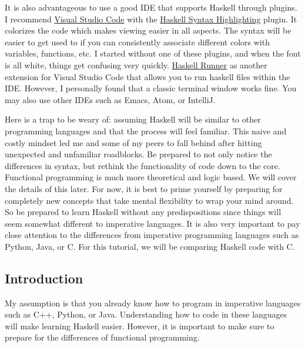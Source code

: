 \documentclass{article}
\begin{document}
\medskip\noindent
It is also advantageous to use a good IDE that supports Haskell through plugins. I recommend \href{https://code.visualstudio.com/}{Visual Studio Code} with the \href{https://marketplace.visualstudio.com/items?itemName=justusadam.language-haskell}{Haskell Syntax Highlighting} plugin. It colorizes the code which makes viewing easier in all aspects. The syntax will be easier to get used to if you can consistently associate different colors with variables, functions, etc. I started without one of these plugins, and when the font is all white, things get confusing very quickly. \href{https://marketplace.visualstudio.com/items?itemName=Meowcolm024.has-go}{Haskell Runner} as another extension for Visual Studio Code that allows you to run haskell files within the IDE. However, I personally found that a classic terminal window works fine. You may also use other IDEs such as Emacs, Atom, or IntelliJ.

\medskip\noindent
Here is a trap to be weary of: assuming Haskell will be similar to other programming languages and that the process will feel familiar. This naive and costly mindset led me and some of my peers to fall behind after hitting unexpected and unfamiliar roadblocks. Be prepared to not only notice the differences in syntax, but rethink the functionality of code down to the core. Functional programming is much more theoretical and logic based. We will cover the details of this later. For now, it is best to prime yourself by preparing for completely new concepts that take mental flexibility to wrap your mind around. So be prepared to learn Haskell without any predispositions since things will seem somewhat different to imperative languages. It is also very important to pay close attention to the differences from imperative programming languages such as Python, Java, or C. For this tutorial, we will be comparing Haskell code with C.

\subsection{Introduction}
\medskip\noindent
My assumption is that you already know how to program in imperative languages such as C++, Python, or Java. Understanding how to code in these languages will make learning Haskell easier. However, it is important to make sure to prepare for the differences of functional programming.
\end{document}
